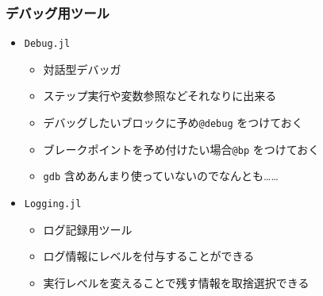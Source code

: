 \begin{frame}[containsverbatim]
\frametitle{デバッグ用ツール}
\begin{itemize}
 \item \verb|Debug.jl|
   \begin{itemize}
     \item 対話型デバッガ
     \item ステップ実行や変数参照などそれなりに出来る
     \item デバッグしたいブロックに予め\verb|@debug| をつけておく
     \item ブレークポイントを予め付けたい場合\verb|@bp| をつけておく
     \item \verb|gdb| 含めあんまり使っていないのでなんとも……
   \end{itemize}
 \item \verb|Logging.jl|
   \begin{itemize}
     \item ログ記録用ツール
     \item ログ情報にレベルを付与することができる
     \item 実行レベルを変えることで残す情報を取捨選択できる
   \end{itemize}
\end{itemize}
\end{frame}

